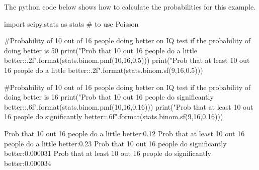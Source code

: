 The python code below shows how to calculate the probabilities for this example.
\begin{python}[caption = Computing binomial probability of null hypothesis] 
import scipy.stats as stats # to use Poisson

#Probability of 10 out of 16 people doing better on IQ test if the probability of doing better is 50%
print("Prob that 10 out 16 people do a little better:{:.2f}".format(stats.binom.pmf(10,16,0.5)))
print("Prob that at least 10 out 16 people do a little better:{:.2f}".format(stats.binom.sf(9,16,0.5)))

#Probability of 10 out of 16 people doing better on IQ test if the probability of doing better is 16%
print("Prob that 10 out 16 people do significantly better:{:.6f}".format(stats.binom.pmf(10,16,0.16)))
print("Prob that at least 10 out 16 people do significantly better:{:.6f}".format(stats.binom.sf(9,16,0.16)))
\end{python}
\begin{poutput}
Prob that 10 out 16 people do a little better:0.12
Prob that at least 10 out 16 people do a little better:0.23
Prob that 10 out 16 people do significantly better:0.000031
Prob that at least 10 out 16 people do significantly better:0.000034
\end{poutput}

